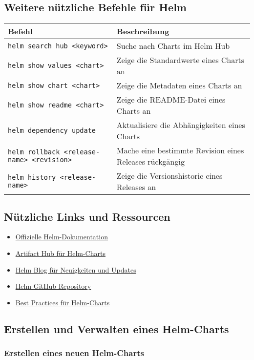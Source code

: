 \subsection{Weitere nützliche Befehle für Helm}
\begin{tabular}{
|p{}|p{}|}
\hline
\textbf{Befehl} & \textbf{Beschreibung} \\
\hline
\texttt{helm search hub <keyword>} & Suche nach Charts im Helm Hub \\
\texttt{helm show values <chart>} & Zeige die Standardwerte eines Charts an \\
\texttt{helm show chart <chart>} & Zeige die Metadaten eines Charts an \\
\texttt{helm show readme <chart>} & Zeige die README-Datei eines Charts an \\
\texttt{helm dependency update} & Aktualisiere die Abhängigkeiten eines Charts \\
\texttt{helm rollback <release-name> <revision>} & Mache eine bestimmte Revision eines Releases rückgängig \\
\texttt{helm history <release-name>} & Zeige die Versionshistorie eines Releases an \\
\hline
\end{tabular}

\subsection{Nützliche Links und Ressourcen}
\begin{itemize}
    \item \href{https://helm.sh/docs/}{Offizielle Helm-Dokumentation}
    \item \href{https://artifacthub.io/}{Artifact Hub für Helm-Charts}
    \item \href{https://helm.sh/blog/}{Helm Blog für Neuigkeiten und Updates}
    \item \href{https://github.com/helm/helm}{Helm GitHub Repository}
    \item \href{https://helm.sh/docs/chart_best_practices/}{Best Practices für Helm-Charts}
\end{itemize}
\newpage
\subsection{Erstellen und Verwalten eines Helm-Charts}

\subsubsection{Erstellen eines neuen Helm-Charts}


